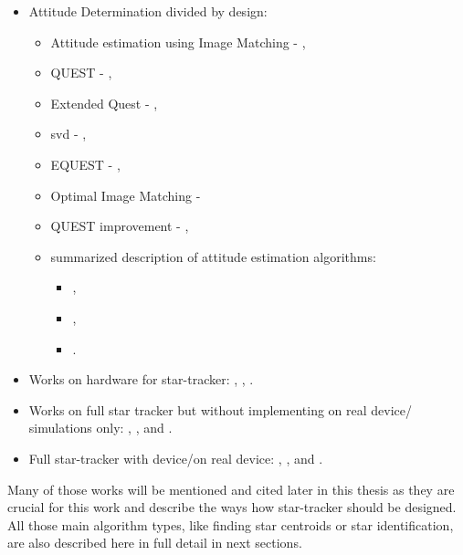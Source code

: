 \documentclass[12pt,a4paper,twoside]{article}
\begin{document}
\begin{itemize}[noitemsep]
\item Attitude Determination divided by design: 
\begin{itemize}[noitemsep]
\item Attitude estimation using Image Matching - \citet{delabie2012highly}, 
\item QUEST - \citet{shuster1990kalman}, 
\item Extended Quest - \citet{psiaki1999extended}, 
\item \gls{svd} - \citet{juang2003efficient},
\item EQUEST - \citet{rinnan2012development}, 
\item Optimal Image Matching - \citet{delabie2012highly}
\item QUEST improvement - \citet{cheng2014improvement}, 
\item summarized description of attitude estimation algorithms: 
\begin{itemize}[noitemsep]
\item \citet{markley1999estimate},
\item \citet{hall2003spacecraft},
\item \citet{tappe2009development}.
\end{itemize}
\end{itemize}

\item Works on hardware for star-tracker: \citet{felikson2011orbit}, \citet{azizabadi2014vlsi}, \citet{gaska2016obc}.

\item Works on full star tracker but without implementing on real device/ simulations only: \citet{rose2003star}, \citet{huffman2006designing}, \citet{diaz2006performance} and \citet{kandiyil2010attitude}.

\item Full star-tracker with device/on real device: \citet{mortari2002starnav}, \citet{cannata2007autonomous}, \citet{lizy2010str} and \citet{jalabert2011optimization}.

\end{itemize}

Many of those works will be mentioned and cited later in this thesis as they are crucial for this work and describe the ways how star-tracker should be designed. All those main algorithm types, like finding star centroids or star identification, are also described here in full detail in next sections.
\end{document}
